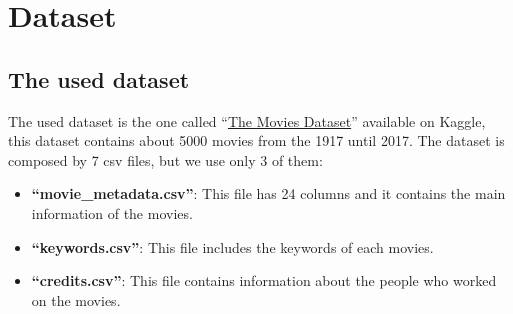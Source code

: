 \documentclass[]{article}
\newcommand{\quotes}[1]{``#1''}
\begin{document}
\section{Dataset}
\subsection{The used dataset}
The used dataset is the one called \quotes{\href{https://www.kaggle.com/datasets/rounakbanik/the-movies-dataset}{The Movies Dataset}} available on Kaggle, this dataset contains about 5000 movies from the 1917 until 2017.\newline
The dataset is composed by 7 csv files, but we use only 3 of them:
\begin{itemize}
	\item \textbf{\quotes{movie\_metadata.csv}}: This file has 24 columns and it contains the main information of the movies.
	\item \textbf{\quotes{keywords.csv}}: This file includes the keywords of each movies.
	\item \textbf{\quotes{credits.csv}}: This file contains information about the people who worked on the movies. 
\end{itemize}
\end{document}
